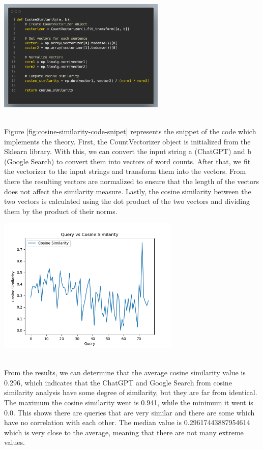 \documentclass[50pt]{usiinfbachelorproject}
\begin{document}
  \noindent
  \begin{minipage}{\linewidth}
  \centering
  \includegraphics[width=0.6\textwidth]{images/cosine-similarity-code-snipet.png}
  \label{fig:cosine-similarity-code-snipet}
  \end{minipage}
  \\
  Figure \ref{fig:cosine-similarity-code-snipet} represents the snippet of the code which implements the theory. First, the CountVectorizer object is initialized from the Sklearn library. With this, we can convert the input string a (ChatGPT) and b (Google Search) to convert them into vectors of word counts. After that, we fit the vectorizer to the input strings and transform them into the vectors. From there the resulting vectors are normalized to ensure that the length of the vectors does not affect the similarity measure. Lastly, the cosine similarity between the two vectors is calculated using the dot product of the two vectors and dividing them by the product of their norms. 

\noindent
  \begin{minipage}{\linewidth}
  \centering
  \includegraphics[width=0.65\textwidth]{images/cosine-similarity.png}
  \label{fig:cosine-similarity}
  \end{minipage}
  \\
  From the results, we can determine that the average cosine similarity value is 0.296, which indicates that the ChatGPT and Google Search from cosine similarity analysis have some degree of similarity, but they are far from identical. The maximum the cosine similarity went is 0.941, while the minimum it went is 0.0. This shows there are queries that are very similar and there are some which have no correlation with each other. The median value is 0.29617443887954614 which is very close to the average, meaning that there are not many extreme values. 
\end{document}
